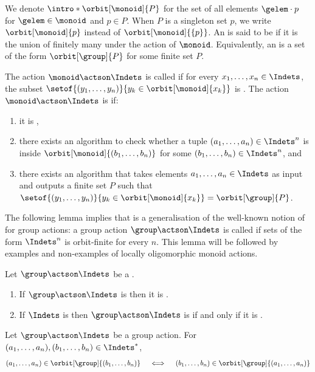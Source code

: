 We denote $\intro*\orbit[\monoid]{P}$ for the set of all elements $\gelem \cdot p$ for $\gelem \in \monoid$ and $p \in P$.
When $P$ is a singleton set ${p}$,
we write $\orbit[\monoid]{p}$ instead of $\orbit[\monoid]{\{p\}}$.
An  is said to be  if it is the
union of finitely many  under the action of $\monoid$.
Equivalently, an 
is a set of the form $\orbit[\group]{P}$ for some finite set $P$.
%
\begin{definition}\label{def:loc oligo}
The action $\monoid\actson\Indets$ is called  if for every $x_1,\dots,x_n\in\Indets$,
the subset $\setof{(y_1,\dots,y_n)}{y_k\in\orbit[\monoid]{x_k}}$ is .
The action $\monoid\actson\Indets$ is  if:
\begin{enumerate}
\item it is ,
\item there exists an algorithm to check whether a tuple $(a_1,\dots,a_n)\in\Indets^n$ is inside $\orbit[\monoid]{(b_1,\dots,b_n)}$ for some $(b_1,\dots,b_n)\in\Indets^n$, and
\item there exists an algorithm that takes elements $a_1,\dots,a_n\in\Indets$ as input and outputs a finite set $P$ such that $\setof{(y_1,\dots,y_n)}{y_k\in\orbit[\monoid]{x_k}} = \orbit[\group]{P}$.
\end{enumerate}
\end{definition}
%
%
The following lemma implies that  is a generalisation of the well-known notion of  for group actions:
a group action $\group\actson\Indets$ is called  if sets of the form $\Indets^n$ is orbit-finite for every $n$.
This lemma will be followed by examples and non-examples of locally oligomorphic monoid actions. 
%
\begin{lemma}\label{lem:oligo loc oligo}
Let $\group\actson\Indets$ be a .
\begin{enumerate}
\item If $\group\actson\Indets$ is  then it is .
\item If $\Indets$ is  then $\group\actson\Indets$ is  if and only if it is .
\end{enumerate}
\end{lemma}
%
\begin{lemma}\label{lem:orbit part}
Let $\group\actson\Indets$ be a group action.
For $(a_1,\dots,a_n),(b_1,\dots,b_n)\in\Indets^*$,
\[
(a_1,\dots,a_n)\in\orbit[\group]{(b_1,\dots,b_n)}
\quad\iff\quad
(b_1,\dots,b_n)\in\orbit[\group]{(a_1,\dots,a_n)}
\]
\end{lemma}
%

